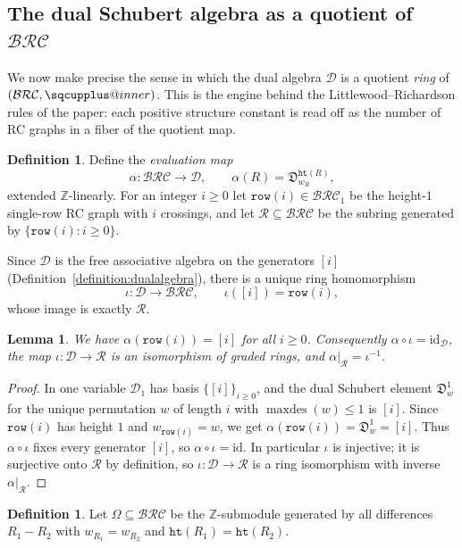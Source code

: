 \documentclass{amsart}
\makeatletter
\newtheorem{lemma}[theorem]{Lemma}
\theoremstyle{definition}
\newtheorem{definition}[theorem]{Definition}
\theoremstyle{remark}
\newcommand{\BRC}{\mathcal{BRC}}
\newcommand{\dcoma}{\mathcal{D}}
\newcommand{\dsch}{\mathfrak{D}}
\newcommand{\rowg}{\mathtt{row}}
\newcommand{\wof}[1]{w_{#1}}
\newcommand{\hr}{\mathtt{ht}}
\newcommand{\maxd}{\operatorname{maxdes}}
\newcommand{\sqcupplus@inner}[2]{%
  \vcenter{\hbox{\ooalign{%
    \hfil$\m@th#1\sqcup$\hfil\cr
    \hfil\raisebox{0.15ex}{$\m@th#1\scriptscriptstyle+$}\hfil\cr
  }}}%
}
\newcommand{\sqcupplus}{\mathbin{\mathpalette\sqcupplus@inner\relax}}
\makeatother
\begin{document}
\subsection{The dual Schubert algebra as a quotient of \texorpdfstring{$\BRC$}{BRC}}\label{section:dschquotient}

We now make precise the sense in which the dual algebra $\dcoma$ is a quotient \emph{ring} of $(\BRC,\sqcupplus)$. This is the engine behind the Littlewood--Richardson rules of the paper: each positive structure constant is read off as the number of RC graphs in a fiber of the quotient map.

\begin{definition}\label{definition:alpha}
Define the \emph{evaluation map}
\[
\alpha:\BRC\to\dcoma,\qquad \alpha(R)=\dsch_{\wof{R}}^{\hr(R)},
\]
extended $\mathbb{Z}$-linearly. For an integer $i\geq 0$ let $\rowg(i)\in\BRC_1$ be the height-$1$ single-row RC graph with $i$ crossings, and let $\mathcal{R}\subseteq\BRC$ be the subring generated by $\{\rowg(i):i\geq 0\}$.
\end{definition}

Since $\dcoma$ is the free associative algebra on the generators $[i]$ (Definition~\ref{definition:dualalgebra}), there is a unique ring homomorphism
\[
\iota:\dcoma\to\BRC,\qquad \iota([i])=\rowg(i),
\]
whose image is exactly $\mathcal{R}$.

\begin{lemma}\label{lemma:schubertrow}
We have $\alpha(\rowg(i))=[i]$ for all $i\geq 0$. Consequently $\alpha\circ\iota=\mathrm{id}_{\dcoma}$, the map $\iota:\dcoma\to\mathcal{R}$ is an isomorphism of graded rings, and $\alpha|_{\mathcal{R}}=\iota^{-1}$.
\end{lemma}
\begin{proof}
In one variable $\dcoma_1$ has basis $\{[i]\}_{i\geq 0}$, and the dual Schubert element $\dsch_w^1$ for the unique permutation $w$ of length $i$ with $\maxd(w)\leq 1$ is $[i]$. Since $\rowg(i)$ has height $1$ and $\wof{\rowg(i)}=w$, we get $\alpha(\rowg(i))=\dsch_w^1=[i]$. Thus $\alpha\circ\iota$ fixes every generator $[i]$, so $\alpha\circ\iota=\mathrm{id}$. In particular $\iota$ is injective; it is surjective onto $\mathcal{R}$ by definition, so $\iota:\dcoma\to\mathcal{R}$ is a ring isomorphism with inverse $\alpha|_{\mathcal{R}}$.
\end{proof}

\begin{definition}\label{definition:omega}
Let $\Omega\subseteq\BRC$ be the $\mathbb{Z}$-submodule generated by all differences $R_1-R_2$ with $\wof{R_1}=\wof{R_2}$ and $\hr(R_1)=\hr(R_2)$.
\end{definition}
\end{document}
